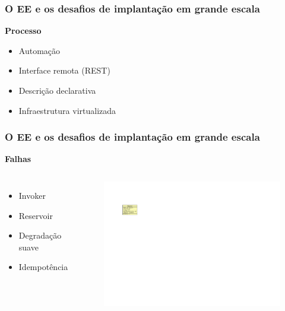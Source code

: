 \documentclass{beamer}
\newcommand\subtitulo[1]{{\large \textbf{#1}}}
\begin{document}

\begin{frame}
\frametitle{O EE e os desafios de implantação em grande escala}

\subtitulo{Processo}

\begin{itemize}
\item Automação
\item Interface remota (REST)
\item Descrição declarativa
\item Infraestrutura virtualizada
\end{itemize}

\end{frame}



\begin{frame}
\frametitle{O EE e os desafios de implantação em grande escala}

\subtitulo{Falhas}

\begin{columns}[c]

\begin{itemize}
\item Invoker
\item Reservoir
\item Degradação suave
\item Idempotência
\end{itemize}

\begin{figure}
\includegraphics[width=0.8\linewidth]{img/invoker}
\end{figure}

\end{columns}
\end{frame}
\end{document}

